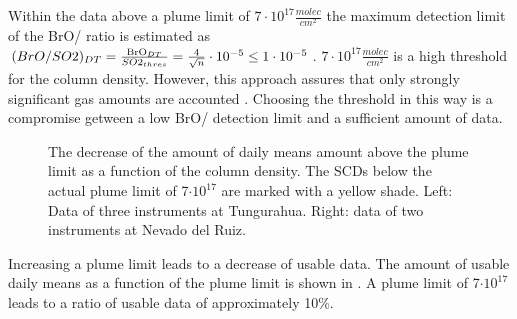 Within the data above a  plume limit of $7\cdot 10^{17} \frac{molec}{cm^2}$ the maximum detection limit of the BrO/ ratio is estimated as $(BrO/SO2)_{DT}	=	\frac{\ce{BrO}_{DT}}{SO2_{thres}}=\frac{4	}{\sqrt{n}}\cdot10^{-5}	 \leq 	1\cdot10^{-5}$.
$7\cdot 10^{17} \frac{molec}{cm^2}$ is a high threshold for the column density. However, this approach assures that only strongly significant gas amounts are accounted \citep{lubcke2014bro}. Choosing the  threshold in this way is a compromise getween a low BrO/ detection limit and a sufficient amount of data.\\
\begin{figure}
	\centering
	\caption{The decrease of the amount of daily means amount above the plume limit as a function of the  column density. The  SCDs below the actual plume limit of 7$\cdot10^{17}$ are marked with a yellow shade. Left: Data of three instruments at Tungurahua. Right: data of two instruments at Nevado del Ruiz.}
	\label{fig:percentageminso2}
\end{figure}
Increasing a plume limit leads to a decrease of usable data. The amount of usable  daily means as a function of the plume limit is shown in . A plume limit of 7$\cdot10^{17}$ leads to a ratio of usable data of approximately 10\%.


